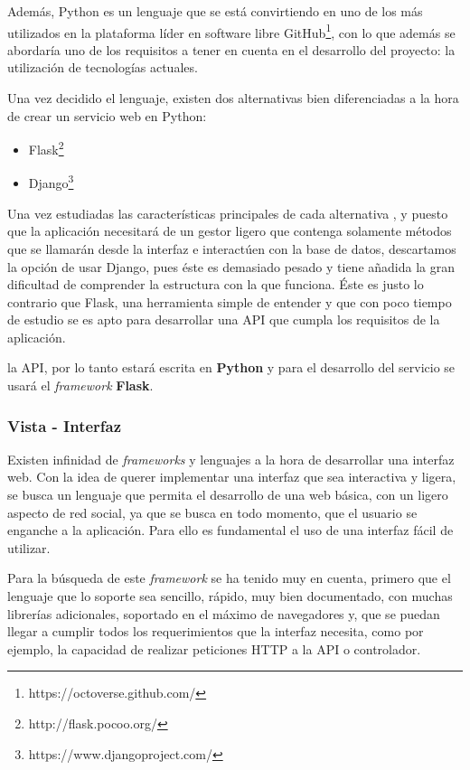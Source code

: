 Además, Python es un lenguaje que se está convirtiendo en uno de los más utilizados en la plataforma líder en software libre GitHub\footnote{https://octoverse.github.com/}, con lo que además se abordaría uno de los requisitos a tener en cuenta en el desarrollo del proyecto: la utilización de tecnologías actuales.

Una vez decidido el lenguaje, existen dos alternativas bien diferenciadas a la hora de crear un servicio web en Python:

\begin{itemize}
    \item Flask\footnote{http://flask.pocoo.org/}
    \item Django\footnote{https://www.djangoproject.com/}
\end{itemize}

Una vez estudiadas las características principales de cada alternativa\cite{flaskvsdjango1} , y puesto que la aplicación necesitará de un gestor ligero que contenga solamente métodos que se llamarán desde la interfaz e interactúen con la base de datos, descartamos la opción de usar Django, pues éste es demasiado pesado y tiene añadida la gran dificultad de comprender la estructura con la que funciona. Éste es justo lo contrario que Flask, una herramienta simple de entender y que con poco tiempo de estudio se es apto para desarrollar una API que cumpla los requisitos de la aplicación. 

la API, por lo tanto estará escrita en \textbf{Python} y para el desarrollo del servicio se usará el \textit{framework} \textbf{Flask}.

\subsubsection{Vista - Interfaz}
\label{sec::analisis_vistaInterfaz}
Existen infinidad de \textit{frameworks} y lenguajes a la hora de desarrollar una interfaz web. Con la idea de querer implementar una interfaz que sea interactiva y ligera, se busca un lenguaje que permita el desarrollo de una web básica, con un ligero aspecto de red social, ya que se busca en todo momento, que el usuario se enganche a la aplicación. Para ello es fundamental el uso de una interfaz fácil de utilizar.

Para la búsqueda de este \textit{framework} se ha tenido muy en cuenta, primero que el lenguaje que lo soporte sea sencillo, rápido, muy bien documentado, con muchas librerías adicionales, soportado en el máximo de navegadores y, que se puedan llegar a cumplir todos los requerimientos que la interfaz necesita, como por ejemplo, la capacidad de realizar peticiones HTTP a la API o controlador.

